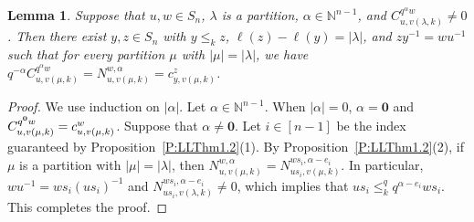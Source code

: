 \documentclass[12pt,oneside,reqno]{amsart}
\newtheorem{lemma}[theorem]{Lemma}
\theoremstyle{definition}
\numberwithin{equation}{section}
\newcommand{\NN}{{\mathbb N}}
\newcommand{\bzero}{{\mathbf 0}}
\begin{document}
\begin{lemma} \label{L:Quantum_is_Classical}
  Suppose that $u,w\in S_n$, $\lambda$ is a partition, $\alpha\in\NN^{n-1}$, and $C^{q^\alpha w}_{u,v(\lambda,k)}\neq 0$.
  Then there exist $y,z\in S_n$ with $y\leq_k z$, $\ell(z)-\ell(y)=|\lambda|$, and $zy^{-1}=wu^{-1}$
  such that for every partition $\mu$ with $|\mu|=|\lambda|$, we have
  $q^{-\alpha}C^{q^\alpha w}_{u,v(\mu,k)}=N^{w,\alpha}_{u,v(\mu,k)}=c^{z}_{y,v(\mu,k)}$. 
\end{lemma}
\begin{proof}
  We use induction on $|\alpha|$.
  Let $\alpha\in\NN^{n-1}$.
  When $|\alpha|=0$, $\alpha={\bzero}$ and $C^{q^{\bf 0}w}_{u,v(\mu,k)}=c^w_{u,v(\mu,k)}$.
  Suppose that $\alpha\neq\bzero$.
  Let $i\in[n{-}1]$ be the index guaranteed by Proposition~\ref{P:LLThm1.2}(1).
  By Proposition~\ref{P:LLThm1.2}(2), if $\mu$ is a partition with $|\mu|=|\lambda|$, then 
  $N^{w,\alpha}_{u,v(\mu,k)}=N^{ws_i, \alpha-e_i}_{us_i,v(\mu,k)}$.
  In particular,   $wu^{-1}=ws_i(u s_i)^{-1}$  and $N^{ws_i, \alpha-e_i}_{us_i,v(\lambda,k)}\neq 0$, which implies that
  $us_i\leq_k^q q^{\alpha-e_i}w s_i$.
  This completes the proof.
\end{proof}
\end{document}
